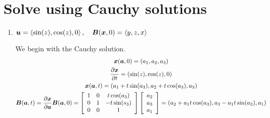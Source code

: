 \documentclass{article}
\begin{document}
\section{Solve using Cauchy solutions}
\begin{enumerate}
    \item $\boldsymbol{u} = \left< \sin(z), \cos(z), 0\right> , \quad \boldsymbol{B}(\boldsymbol{x},0) = \left< y,
    z, x\right>$
    
    We begin with the Cauchy solution. 
    \begin{gather*}
        \boldsymbol{x}(\boldsymbol{a}, 0) = \left(a_1, a_2, a_3\right)\\
        \frac{\partial \boldsymbol{x}}{\partial t} = \left(\sin(z), \cos(z), 0\right)\\
        \boldsymbol{x}(\boldsymbol{a},t) = \left(a_1 + t\sin(a_3), a_2 + t\cos(a_3), a_3\right)\\
        \boldsymbol{B}(\boldsymbol{a},t) = \frac{\partial \boldsymbol{x}}{\partial \boldsymbol{a}}\boldsymbol{B}(\boldsymbol{a},0)
        = \left[\begin{array}{c c c}
        1 & 0 & t\cos(a_3)\\
        0 & 1 & -t\sin(s_3)\\
        0 & 0 & 1\end{array}\right] \left[\begin{array}{c}
        a_2\\a_3\\a_1\end{array}\right] = \left(a_2 + a_1t\cos(a_3), a_3 -
        a_1t\sin(a_3), a_1\right)
    \end{gather*}


\end{enumerate}
\end{document}
